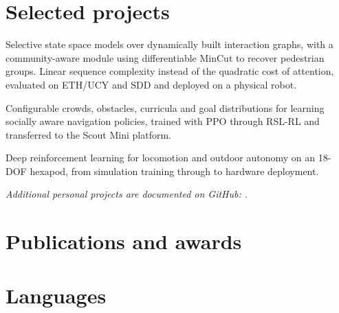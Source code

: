 \documentclass[10pt]{article}
\begin{document}
\section{Selected projects}

\begin{detail}
Selective state space models over dynamically built interaction graphs, with a
community-aware module using differentiable MinCut to recover pedestrian groups.
Linear sequence complexity instead of the quadratic cost of attention, evaluated
on ETH/UCY and SDD and deployed on a physical robot.
\end{detail}

\begin{detail}
Configurable crowds, obstacles, curricula and goal distributions for learning
socially aware navigation policies, trained with PPO through RSL-RL and
transferred to the Scout Mini platform.
\end{detail}

\begin{detail}
Deep reinforcement learning for locomotion and outdoor autonomy on an 18-DOF
hexapod, from simulation training through to hardware deployment.
\end{detail}
\begin{detail}
{\fontsize{9}{11.5}\selectfont\itshape Additional personal projects are documented on GitHub: .}
\end{detail}

\section{Publications and awards}


\section{Languages}

\end{document}
